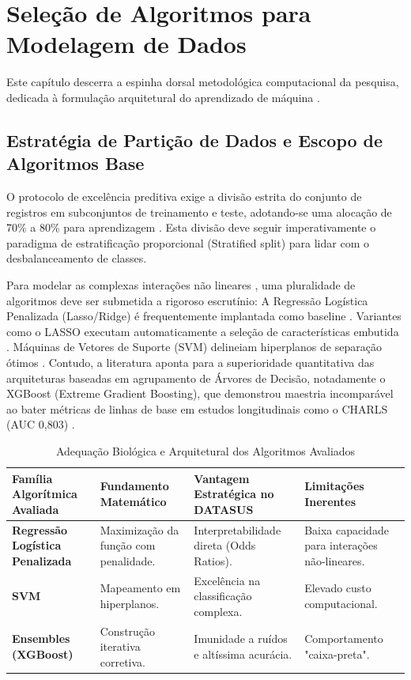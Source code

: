 \documentclass[12pt,openright,oneside,a4paper,brazil]{abntex2}
\begin{document}
\chapter{Seleção de Algoritmos para Modelagem de Dados}

Este capítulo descerra a espinha dorsal metodológica computacional da pesquisa, dedicada à formulação arquitetural do aprendizado de máquina \cite{ref10, ref14, ref26}.

\section{Estratégia de Partição de Dados e Escopo de Algoritmos Base}
O protocolo de excelência preditiva exige a divisão estrita do conjunto de registros em subconjuntos de treinamento e teste, adotando-se uma alocação de 70\% a 80\% para aprendizagem \cite{ref10}. Esta divisão deve seguir imperativamente o paradigma de estratificação proporcional (Stratified split) para lidar com o desbalanceamento de classes.

Para modelar as complexas interações não lineares \cite{ref13}, uma pluralidade de algoritmos deve ser submetida a rigoroso escrutínio:
A Regressão Logística Penalizada (Lasso/Ridge) é frequentemente implantada como baseline \cite{ref10, ref26}. Variantes como o LASSO executam automaticamente a seleção de características embutida \cite{ref10, ref11}. Máquinas de Vetores de Suporte (SVM) delineiam hiperplanos de separação ótimos \cite{ref25, ref35}. Contudo, a literatura aponta para a superioridade quantitativa das arquiteturas baseadas em agrupamento de Árvores de Decisão, notadamente o XGBoost (Extreme Gradient Boosting), que demonstrou maestria incomparável ao bater métricas de linhas de base em estudos longitudinais como o CHARLS (AUC 0,803) \cite{ref11, ref36}.

\begin{table}[htb]
\centering
\caption{Adequação Biológica e Arquitetural dos Algoritmos Avaliados}
\label{tab:algoritmos}
\begin{tabular}{|p{3.5cm}|p{3.5cm}|p{4cm}|p{3.5cm}|}
\hline
\textbf{Família Algorítmica Avaliada} & \textbf{Fundamento Matemático} & \textbf{Vantagem Estratégica no DATASUS} & \textbf{Limitações Inerentes} \\ \hline
\textbf{Regressão Logística Penalizada} & Maximização da função com penalidade. & Interpretabilidade direta (Odds Ratios). \cite{ref10, ref26} & Baixa capacidade para interações não-lineares. \\ \hline
\textbf{SVM} & Mapeamento em hiperplanos. & Excelência na classificação complexa. \cite{ref25, ref35} & Elevado custo computacional. \\ \hline
\textbf{Ensembles (XGBoost)} & Construção iterativa corretiva. & Imunidade a ruídos e altíssima acurácia. \cite{ref10, ref11, ref13, ref36} & Comportamento "caixa-preta". \\ \hline
\end{tabular}
\end{table}
\end{document}
